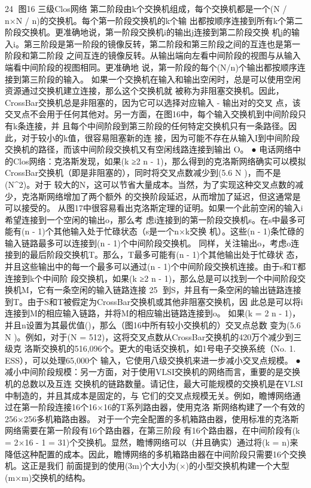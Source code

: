                                                    24
图16 三级Clos网络
第二阶段由k个交换机组成，每个交换机都是一个(N / n×N / n)的交换机。每个第一阶段交换机的k个输
出都按顺序连接到所有k个第二阶段交换机。更准确地说，第一阶段交换机i的输出j连接到第二阶段交换
机j的输入i。第三阶段是第一阶段的镜像反转，第二阶段和第三阶段之间的互连也是第一阶段和第二阶段
之间互连的镜像反转。从输出端向左看中间阶段的视图与从输入端看中间阶段的视图相同。更准确地
说，第一阶段的每个(N/n)个输出都按顺序连接到第三阶段的输入。
如果一个交换机在输入和输出空闲时，总是可以使用空闲资源通过交换机建立连接，那么这个交换机就
被称为非阻塞交换机。因此，CrossBar交换机总是非阻塞的，因为它可以选择对应输入 - 输出对的交叉
点，该交叉点不会用于任何其他对。另一方面，在图16中，每个输入交换机到中间阶段只有k条连接，并
且每个中间阶段到第三阶段的任何特定交换机只有一条路径。因此，对于较小的k值，很容易阻塞新的连
接，因为可能不存在从输入I到中间阶段交换机的路径，而该中间阶段交换机又有空闲线路连接到输出
O。
 ● 电话网络中的Clos网络：克洛斯发现，如果(k ≥2 n - 1)，那么得到的克洛斯网络确实可以模拟
   CrossBar交换机（即是非阻塞的），同时将交叉点数减少到(5.6 N )，而不是(N^{2})。对于
   较大的N，这可以节省大量成本。当然，为了实现这种交叉点数的减少，克洛斯网络增加了两个额外
   的交换阶段延迟，从而增加了延迟，但这通常是可以接受的。
从图17中很容易看出克洛斯定理的证明。如果一个此前空闲的输入i希望连接到一个空闲的输出o，那么考
虑i连接到的第一阶段交换机s。在s中最多可能有(n - 1)个其他输入处于忙碌状态（s是一个n×k交换
机）。这些(n - 1)条忙碌的输入链路最多可以连接到(n - 1)个中间阶段交换机。
同样，关注输出o，考虑o连接到的最后阶段交换机T。那么，T最多可能有(n - 1)个其他输出处于忙碌状
态，并且这些输出中的每一个最多可以通过(n - 1)个中间阶段交换机连接。由于s和T都连接到k个中间阶
段交换机，如果(k ≥2 n - 1)，那么总是可以找到一个中间阶段交换机M，它有一条空闲的输入链路连接
                                                             25
到S，并且有一条空闲的输出链路连接到T。由于S和T被假定为CrossBar交换机或其他非阻塞交换机，因
此总是可以将i连接到M的相应输入链路，并将M的相应输出链路连接到o。
如果(k = 2 n - 1)，并且n设置为其最优值()，那么（图16中所有较小交换机的）交叉点总数
变为(5.6 N )。例如，对于(N = 512)，这将交叉点数从CrossBar交换机的420万个减少到三级克
洛斯交换机的516,096个。更大的电话交换机，如1号电子交换系统（No. 1. ESS），可以处理65,000个
输入，它使用八级交换机来进一步减小交叉点规模。
  ● 减小中间阶段规模：另一方面，对于使用VLSI交换机的网络而言，重要的是交换机的总数以及互连
    交换机的链路数量。请记住，最大可能规模的交换机是在VLSI中制造的，并且其成本是固定的，与
    它们的交叉点规模无关。例如，瞻博网络通过在第一阶段连接16个16×16的T系列路由器，使用克洛
    斯网络构建了一个有效的256×256多机箱路由器。
对于一个完全配置的多机箱路由器，使用标准的克洛斯网络需要在第一阶段有16个路由器，在第三阶段
有16个路由器，在中间阶段有(k = 2×16 - 1 = 31)个交换机。显然，瞻博网络可以（并且确实）通过将(k
= n)来降低这种配置的成本。因此，瞻博网络的多机箱路由器在中间阶段只需要16个交换机。这正是我们
前面提到的使用(3m)个大小为(×)的小型交换机构建一个大型(m×m)交换机的结构。





